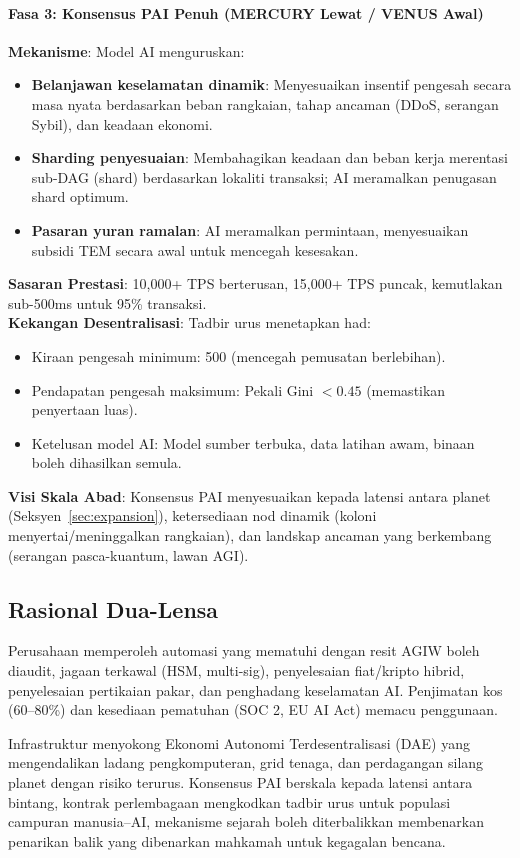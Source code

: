 \documentclass[11pt]{article}
\begin{document}
\paragraph{Fasa 3: Konsensus PAI Penuh (MERCURY Lewat / VENUS Awal)}
\textbf{Mekanisme}: Model AI menguruskan:
\begin{itemize}[noitemsep]
  \item \textbf{Belanjawan keselamatan dinamik}: Menyesuaikan insentif pengesah secara masa nyata berdasarkan beban rangkaian, tahap ancaman (DDoS, serangan Sybil), dan keadaan ekonomi.
  \item \textbf{Sharding penyesuaian}: Membahagikan keadaan dan beban kerja merentasi sub-DAG (shard) berdasarkan lokaliti transaksi; AI meramalkan penugasan shard optimum.
  \item \textbf{Pasaran yuran ramalan}: AI meramalkan permintaan, menyesuaikan subsidi TEM secara awal untuk mencegah kesesakan.
\end{itemize}
\textbf{Sasaran Prestasi}: 10,000+ TPS berterusan, 15,000+ TPS puncak, kemutlakan sub-500ms untuk 95\% transaksi.\\
\textbf{Kekangan Desentralisasi}: Tadbir urus menetapkan had:
\begin{itemize}[noitemsep]
  \item Kiraan pengesah minimum: 500 (mencegah pemusatan berlebihan).
  \item Pendapatan pengesah maksimum: Pekali Gini $<0.45$ (memastikan penyertaan luas).
  \item Ketelusan model AI: Model sumber terbuka, data latihan awam, binaan boleh dihasilkan semula.
\end{itemize}
\textbf{Visi Skala Abad}: Konsensus PAI menyesuaikan kepada latensi antara planet (Seksyen~\ref{sec:expansion}), ketersediaan nod dinamik (koloni menyertai/meninggalkan rangkaian), dan landskap ancaman yang berkembang (serangan pasca-kuantum, lawan AGI).

\subsection{Rasional Dua-Lensa}
\begin{description}[style=nextline]
  \item[Jangka Pendek (Era MERCURY)] Perusahaan memperoleh automasi yang mematuhi dengan resit AGIW boleh diaudit, jagaan terkawal (HSM, multi-sig), penyelesaian fiat/kripto hibrid, penyelesaian pertikaian pakar, dan penghadang keselamatan AI. Penjimatan kos (60--80\%) dan kesediaan pematuhan (SOC 2, EU AI Act) memacu penggunaan.
  \item[Skala Abad (VENUS hingga ANDROMEDA)] Infrastruktur menyokong Ekonomi Autonomi Terdesentralisasi (DAE) yang mengendalikan ladang pengkomputeran, grid tenaga, dan perdagangan silang planet dengan risiko terurus. Konsensus PAI berskala kepada latensi antara bintang, kontrak perlembagaan mengkodkan tadbir urus untuk populasi campuran manusia--AI, mekanisme sejarah boleh diterbalikkan membenarkan penarikan balik yang dibenarkan mahkamah untuk kegagalan bencana.
\end{description}
\end{document}
